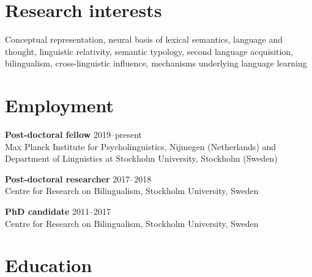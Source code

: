 \documentclass[margin, 11pt]{res} %
\begin{document}
\begin{resume}

% 
%

\section{\sc Research interests}
Conceptual representation, neural basis of lexical semantics,
language and thought, linguistic relativity,
semantic typology,
second language acquisition, bilingualism, cross-linguistic influence, 
mechanisms underlying language learning
\\




\section{\sc Employment}

{\bf Post-doctoral fellow} \hfill 2019--present\\ 
Max Planck Institute for Psycholinguistics, Nijmegen (Netherlands) and
Department of Linguistics at Stockholm University, Stockholm (Sweden)


{\bf Post-doctoral researcher} \hfill 2017--2018\\
Centre for Research on Bilingualism, Stockholm University, Sweden
 
{\bf PhD candidate} \hfill 2011--2017\\
Centre for Research on Bilingualism, Stockholm University, Sweden
 
 


\section{\sc Education}


\end{resume}
\end{document}
